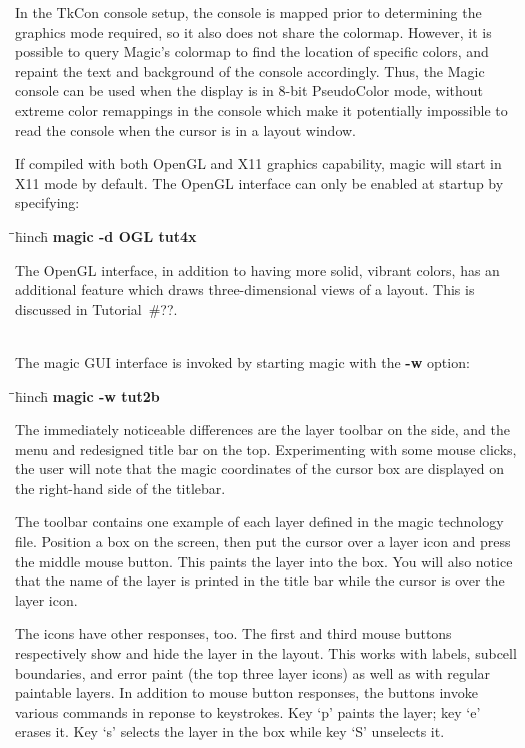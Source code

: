 \documentclass[letterpaper,twoside,12pt]{article}
\def\hinch{\hspace*{0.5in}}
\def\starti{\begin{center}\begin{tabbing}\hinch\=\hinch\=\hinch\=hinch\hinch\=\kill}
\def\endi{\end{tabbing}\end{center}}
\def\ii{\>\>\>}
\begin{document}
In the TkCon console setup, the console is mapped prior to determining
the graphics mode required, so it also does not share the colormap.
However, it is possible to query Magic's colormap to find the location
of specific colors, and repaint the text and background of the console
accordingly.  Thus, the Magic console can be used when the display is
in 8-bit PseudoColor mode, without extreme color remappings in the
console which make it potentially impossible to read the console when
the cursor is in a layout window.

If compiled with both OpenGL and X11 graphics capability, magic will
start in X11 mode by default.  The OpenGL interface can only be
enabled at startup by specifying:
\starti
   \ii {\itshape \#} {\bfseries magic -d OGL tut4x} \\
\endi
The OpenGL interface, in addition to having more solid, vibrant
colors, has an additional feature which draws three-dimensional views
of a layout.  This is discussed in Tutorial~\#??.

\medskip
{} \\

The magic GUI interface is invoked by starting magic with the {\bfseries
-w} option:
\starti
   \ii {\itshape \#} {\bfseries magic -w tut2b} \\
\endi

The immediately noticeable differences are the layer toolbar on the side,
and the menu and redesigned title bar on the top.  Experimenting with
some mouse clicks, the user will note that the magic coordinates of the
cursor box are displayed on the right-hand side of the titlebar.

The toolbar contains one example of each layer defined in the magic
technology file.  Position a box on the screen, then put the cursor
over a layer icon and press the middle mouse button.  This paints the
layer into the box.  You will also notice that the name of the layer
is printed in the title bar while the cursor is over the layer icon.

The icons have other responses, too.  The first and third mouse buttons
respectively show and hide the layer in the layout.  This works with
labels, subcell boundaries, and error paint (the top three layer icons)
as well as with regular paintable layers.  In addition to mouse button
responses, the buttons invoke various commands in reponse to keystrokes.
Key `p' paints the layer;  key `e' erases it.  Key `s' selects the layer
in the box while key `S' unselects it.
\end{document}
